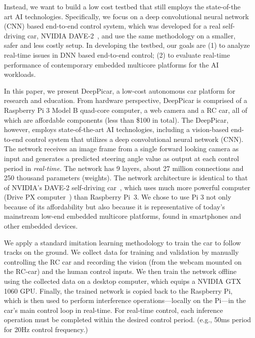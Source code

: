 Instead, we want to build a low cost testbed that still employs the
state-of-the art AI technologies. Specifically, we focus on a deep
convolutional neural network (CNN) based end-to-end control system,
which was developed for a real self-driving car, NVIDIA
DAVE-2~\cite{Bojarski2016}, and use the same methodology on a
smaller, safer and less costly setup. In developing the testbed, our
goals are (1) to analyze real-time issues in DNN based end-to-end
control; (2) to evaluate real-time performance of contemporary embedded
multicore platforms for the AI workloads.

In this paper, we present DeepPicar, a low-cost autonomous car
platform for research and education. From hardware perspective,
DeepPicar is comprised of a Raspberry Pi 3 Model B quad-core
computer, a web camera and a RC car, all of which are affordable
components (less than \$100 in total).
The DeepPicar, however, employs state-of-the-art AI
technologies, including a vision-based end-to-end control system that
utilizes a deep convolutional neural network (CNN).
The network receives an image frame from a single forward
looking camera as input and generates a predicted steering angle
value as output at each control period in \emph{real-time}.
The network has 9 layers, about 27 million connections
and 250 thousand parameters (weights).
The network architecture is identical to that of NVIDIA's DAVE-2
self-driving car~\cite{Bojarski2016}, which uses much more powerful
computer (Drive PX computer~\cite{drivepx}) than Raspberry Pi~3.
We chose to use Pi 3 not only because of its
affordability but also because it is representative
of today's mainstream low-end embedded multicore platforms, found in
smartphones and other embedded devices.


We apply a standard imitation learning methodology to train the car to
follow tracks on the ground. We collect data for
training and validation by manually
controlling the RC car and recording the vision (from the webcam
mounted on the RC-car) and the human control inputs. We then train the
network offline using the collected data on a desktop computer, which
equips a NVIDIA GTX 1060 GPU. Finally, the trained network is copied
back to the Raspberry Pi, which is then used to perform interference
operations---locally on the Pi---in the car's main control loop in
real-time. For real-time control, each inference operation must
be completed within the desired control period. (e.g., 50ms period for
20Hz control frequency.)

